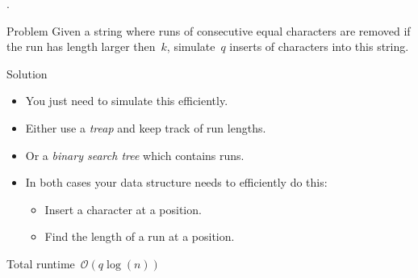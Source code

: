 \begin{frame}{.}
	\begin{block}{Problem}
		Given a string where runs of consecutive equal characters are removed if the run has length larger then~$k$, simulate~$q$ inserts of characters into this string.
	\end{block}
	\pause
	\begin{block}{Solution}
		\begin{itemize}
			\item You just need to simulate this efficiently.
      \item Either use a \emph{treap} and keep track of run lengths.
      \item Or a \emph{binary search tree} which contains runs.
			\item In both cases your data structure needs to efficiently do this:
			\begin{itemize}
				\item Insert a character at a position.
				\item Find the length of a run at a position.
			\end{itemize}
		\end{itemize}
		Total runtime~$\mathcal{O}(q\log(n))$
	\end{block}
\end{frame}
